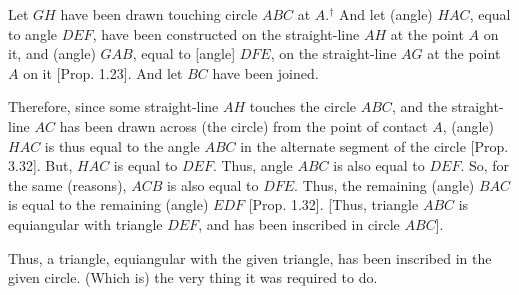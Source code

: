 \begin{Parallel}{}{}
{Let $GH$ have been drawn touching circle $ABC$ at $A$.$^\dag$ And let  (angle) $HAC$, equal to angle $DEF$,  have been constructed
on the straight-line $AH$ at the point $A$ on it, and (angle) $GAB$, equal to
[angle] $DFE$,  on the straight-line $AG$ at the point $A$ on it
 [Prop. 1.23]. And let $BC$ have been joined.
 
 Therefore, since some straight-line $AH$ touches the circle $ABC$, and the
 straight-line $AC$ has been drawn across (the circle) from the point of
 contact $A$, (angle) $HAC$ is thus equal to the angle $ABC$ in the alternate
 segment of the circle [Prop. 3.32]. But, $HAC$ is equal to $DEF$.
 Thus, angle $ABC$ is also equal to $DEF$. So, for the same (reasons),
 $ACB$ is also equal to $DFE$.  Thus, the remaining (angle) $BAC$ is equal
 to the remaining (angle) $EDF$ [Prop. 1.32]. [Thus, triangle
 $ABC$ is equiangular with triangle $DEF$, and has been inscribed in circle
 $ABC$].
 
 Thus, a triangle, equiangular with the given triangle, has been inscribed in
 the given circle. (Which is) the very thing it was required to do.}
\end{Parallel}


\vspace{7pt}{\footnotesize \noindent$^\dag$ See the footnote
to Prop.~3.34.}

